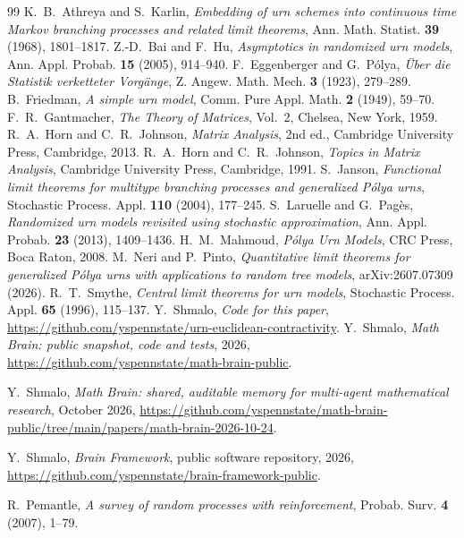 \documentclass[11pt]{amsart}
\theoremstyle{definition}
\theoremstyle{remark}
\begin{document}
\begin{thebibliography}{99}
 K.~B.~Athreya and S.~Karlin, \emph{Embedding of urn schemes into continuous time Markov branching processes and related limit theorems}, Ann. Math. Statist. \textbf{39} (1968), 1801--1817.
 Z.-D.~Bai and F.~Hu, \emph{Asymptotics in randomized urn models}, Ann. Appl. Probab. \textbf{15} (2005), 914--940.
 F.~Eggenberger and G.~P\'olya, \emph{\"Uber die Statistik verketteter Vorg\"ange}, Z. Angew. Math. Mech. \textbf{3} (1923), 279--289.
 B.~Friedman, \emph{A simple urn model}, Comm. Pure Appl. Math. \textbf{2} (1949), 59--70.
 F.~R.~Gantmacher, \emph{The Theory of Matrices}, Vol.~2, Chelsea, New York, 1959.
 R.~A.~Horn and C.~R.~Johnson, \emph{Matrix Analysis}, 2nd ed., Cambridge University Press, Cambridge, 2013.
 R.~A.~Horn and C.~R.~Johnson, \emph{Topics in Matrix Analysis}, Cambridge University Press, Cambridge, 1991.
 S.~Janson, \emph{Functional limit theorems for multitype branching processes and generalized P\'olya urns}, Stochastic Process. Appl. \textbf{110} (2004), 177--245.
 S.~Laruelle and G.~Pag\`es, \emph{Randomized urn models revisited using stochastic approximation}, Ann. Appl. Probab. \textbf{23} (2013), 1409--1436.
 H.~M.~Mahmoud, \emph{P\'olya Urn Models}, CRC Press, Boca Raton, 2008.
 M.~Neri and P.~Pinto, \emph{Quantitative limit theorems for generalized P\'olya urns with applications to random tree models}, arXiv:2607.07309 (2026).
 R.~T.~Smythe, \emph{Central limit theorems for urn models}, Stochastic Process. Appl. \textbf{65} (1996), 115--137.
 Y.~Shmalo, \emph{Code for this paper}, \url{https://github.com/yspennstate/urn-euclidean-contractivity}.
 Y.~Shmalo, \emph{Math Brain: public snapshot, code and tests}, 2026, \url{https://github.com/yspennstate/math-brain-public}.

 Y.~Shmalo, \emph{Math Brain: shared, auditable memory for multi-agent mathematical research}, October 2026, \url{https://github.com/yspennstate/math-brain-public/tree/main/papers/math-brain-2026-10-24}.

 Y.~Shmalo, \emph{Brain Framework}, public software repository, 2026, \url{https://github.com/yspennstate/brain-framework-public}.

 R.~Pemantle, \emph{A survey of random processes with reinforcement}, Probab. Surv. \textbf{4} (2007), 1--79.
\end{thebibliography}
\end{document}
